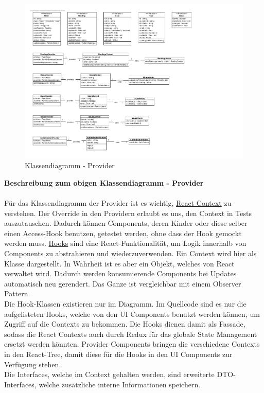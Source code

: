 \begin{figure}[H]
	\hspace{-3cm}
	\includegraphics[scale = 0.9]{./img/diagrams/providers-classDiagram}
	\caption{Klassendiagramm - Provider}
\end{figure}
\newpage

\noindent \textbf{Beschreibung zum obigen Klassendiagramm - Provider} \\ \\
Für das Klassendiagramm der Provider ist es wichtig, \href{https://reactjs.org/docs/context.html}{React Context} zu verstehen.  Der Override in den Providern erlaubt es uns, den Context in Tests auszutauschen. Dadurch können Components, deren Kinder oder diese selber einen Access-Hook  benutzen, getestet werden, ohne dass der Hook gemockt werden muss. \href{https://reactjs.org/docs/hooks-intro.html}{Hooks} sind eine React-Funktionalität, um Logik innerhalb von Components zu abstrahieren und wiederzuverwenden. Ein Context wird hier als Klasse dargestellt. In Wahrheit ist es aber ein Objekt, 
welches von React verwaltet wird. Dadurch werden konsumierende Components bei Updates automatisch neu gerendert. Das Ganze ist vergleichbar mit einem Observer Pattern. \\
Die Hook-Klassen existieren nur im Diagramm. Im Quellcode sind es nur die aufgelisteten Hooks, welche von den UI Components benutzt werden können, um Zugriff auf die Contexts zu bekommen. Die Hooks dienen damit als Fassade, sodass die React Contexts auch durch Redux für das globale State Management ersetzt werden könnten.
Provider Components bringen die verschiedene Contexts in den React-Tree, damit diese für die Hooks in den UI Components zur Verfügung stehen.\\
Die Interfaces, welche im Context gehalten werden, sind erweiterte DTO-Interfaces, welche zusätzliche interne Informationen speichern.

